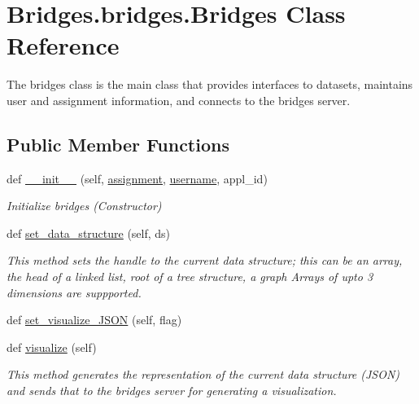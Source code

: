 \hypertarget{class_bridges_1_1bridges_1_1_bridges}{}\section{Bridges.\+bridges.\+Bridges Class Reference}
\label{class_bridges_1_1bridges_1_1_bridges}


The bridges class is the main class that provides interfaces to datasets, maintains user and assignment information, and connects to the bridges server.  


\subsection*{Public Member Functions}
\begin{DoxyCompactItemize}
\item 
def \hyperlink{class_bridges_1_1bridges_1_1_bridges_ad3a26dd5ee8dea00adbc5345e4f313d6}{\+\_\+\+\_\+init\+\_\+\+\_\+} (self, \hyperlink{class_bridges_1_1bridges_1_1_bridges_a2532355e121918d9c30c4fb19161e92e}{assignment}, \hyperlink{class_bridges_1_1bridges_1_1_bridges_a09593511340ae03bed2abbf9dd12f48f}{username}, appl\+\_\+id)
\begin{DoxyCompactList}\small\item\em Initialize bridges (Constructor) \end{DoxyCompactList}\item 
def \hyperlink{class_bridges_1_1bridges_1_1_bridges_adab1ccb3816211bc81054f8fb537833f}{set\+\_\+data\+\_\+structure} (self, ds)
\begin{DoxyCompactList}\small\item\em This method sets the handle to the current data structure; this can be an array, the head of a linked list, root of a tree structure, a graph Arrays of upto 3 dimensions are suppported. \end{DoxyCompactList}\item 
def \hyperlink{class_bridges_1_1bridges_1_1_bridges_a945f547bc7feb7e129811f8874a3af6b}{set\+\_\+visualize\+\_\+\+J\+S\+O\+N} (self, flag)
\item 
def \hyperlink{class_bridges_1_1bridges_1_1_bridges_ad25ec4119ef21f031c6240a9d6d996c6}{visualize} (self)
\begin{DoxyCompactList}\small\item\em This method generates the representation of the current data structure (J\+S\+O\+N) and sends that to the bridges server for generating a visualization. \end{DoxyCompactList}\item 

\end{DoxyCompactItemize}

